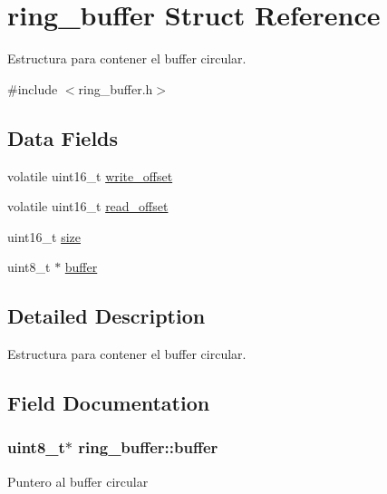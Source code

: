 \hypertarget{structring__buffer}{}\section{ring\+\_\+buffer Struct Reference}
\label{structring__buffer}


Estructura para contener el buffer circular.  




{\ttfamily \#include $<$ring\+\_\+buffer.\+h$>$}

\subsection*{Data Fields}
\begin{DoxyCompactItemize}
\item 
volatile uint16\+\_\+t \hyperlink{structring__buffer_a39755539dd29fbbbdd184f60e41500eb}{write\+\_\+offset}
\item 
volatile uint16\+\_\+t \hyperlink{structring__buffer_ac5ac57ce34ad5f9e2fb7d5f15484131f}{read\+\_\+offset}
\item 
uint16\+\_\+t \hyperlink{structring__buffer_a6d5d1e99514e08157b9f8f7549892ee6}{size}
\item 
uint8\+\_\+t $\ast$ \hyperlink{structring__buffer_add403d592f49a0a28f77fc23e276832b}{buffer}
\end{DoxyCompactItemize}


\subsection{Detailed Description}
Estructura para contener el buffer circular. 

\subsection{Field Documentation}
\subsubsection[{\texorpdfstring{buffer}{buffer}}]{\setlength{\rightskip}{0pt plus 5cm}uint8\+\_\+t$\ast$ ring\+\_\+buffer\+::buffer}\hypertarget{structring__buffer_add403d592f49a0a28f77fc23e276832b}{}\label{structring__buffer_add403d592f49a0a28f77fc23e276832b}
Puntero al buffer circular 
